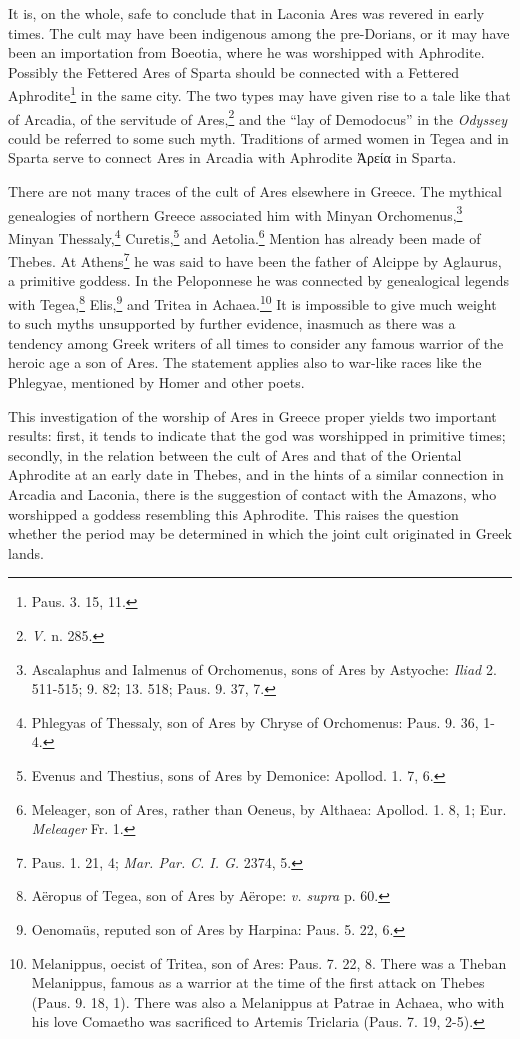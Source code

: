 \documentclass[a4paper, 12pt, oneside]{article}
\begin{document}
It is, on the whole, safe to conclude that in Laconia Ares was revered in early times. The cult may have been indigenous among the pre-Dorians, or it may have been an importation from Boeotia, where he was worshipped with Aphrodite. Possibly the Fettered Ares of Sparta should be connected with a Fettered Aphrodite\footnote{Paus. 3. 15, 11.} in the same city. The two types may have given rise to a tale like that of Arcadia, of the servitude of Ares,\footnote{\emph{V.} n. 285.} and the ``lay of Demodocus'' in the \emph{Odyssey} could be referred to some such myth. Traditions of armed women in Tegea and in Sparta serve to connect Ares in Arcadia with Aphrodite Ἀρεία in Sparta.

There are not many traces of the cult of Ares elsewhere in Greece. The mythical genealogies of northern Greece associated him with Minyan Orchomenus,\footnote{Ascalaphus and Ialmenus of Orchomenus, sons of Ares by Astyoche: \emph{Iliad} 2. 511-515; 9. 82; 13. 518; Paus. 9. 37, 7.} Minyan Thessaly,\footnote{Phlegyas of Thessaly, son of Ares by Chryse of Orchomenus: Paus. 9. 36, 1-4.} Curetis,\footnote{Evenus and Thestius, sons of Ares by Demonice: Apollod. 1. 7, 6.} and Aetolia.\footnote{Meleager, son of Ares, rather than Oeneus, by Althaea: Apollod. 1. 8, 1; Eur. \emph{Meleager} Fr. 1.} Mention has already been made of Thebes. At Athens\footnote{Paus. 1. 21, 4; \emph{Mar. Par.} \emph{C. I. G.} 2374, 5.} he was said to have been the father of Alcippe by Aglaurus, a primitive goddess. In the Peloponnese he was connected by genealogical legends with Tegea,\footnote{Aëropus of Tegea, son of Ares by Aërope: \emph{v. supra} p. 60.} Elis,\footnote{Oenomaüs, reputed son of Ares by Harpina: Paus. 5. 22, 6.} and Tritea in Achaea.\footnote{Melanippus, oecist of Tritea, son of Ares: Paus. 7. 22, 8. There was a Theban Melanippus, famous as a warrior at the time of the first attack on Thebes (Paus. 9. 18, 1). There was also a Melanippus at Patrae in Achaea, who with his love Comaetho was sacrificed to Artemis Triclaria (Paus. 7. 19, 2-5).} It is impossible to give much weight to such myths unsupported by further evidence, inasmuch as there was a tendency among Greek writers of all times to consider any famous warrior of the heroic age a son of Ares. The statement applies also to war-like races like the Phlegyae, mentioned by Homer and other poets.

This investigation of the worship of Ares in Greece proper yields two important results: first, it tends to indicate that the god was worshipped in primitive times; secondly, in the relation between the cult of Ares and that of the Oriental Aphrodite at an early date in Thebes, and in the hints of a similar connection in Arcadia and Laconia, there is the suggestion of contact with the Amazons, who worshipped a goddess resembling this Aphrodite. This raises the question whether the period may be determined in which the joint cult originated in Greek lands.
\end{document}
